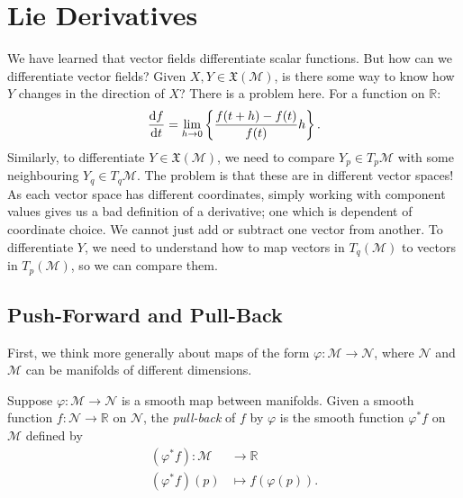 \section{Lie Derivatives}%
\label{sec:lie_derivatives}

We have learned that vector fields differentiate scalar functions. But how can we differentiate vector fields?
Given $X, Y \in \mathfrak{X}(\mathcal{M})$, is there some way to know how $Y$ changes in the direction of $X$?
There is a problem here. For a function on $\mathbb{R}$:
\begin{equation}
\dv{f}{t} = \lim_{h \to 0} \left\{ \frac{f(t + h) - f(t)}{f(t)}{h} \right\}.
\end{equation}
Similarly, to differentiate $Y \in \mathfrak{X}(\mathcal{M})$, we need to compare $Y_p \in T_p \mathcal{M}$ with some neighbouring $Y_q \in T_q \mathcal{M}$. The problem is that these are in different vector spaces! As each vector space has different coordinates, simply working with component values gives us a bad definition of a derivative; one which is dependent of coordinate choice. We cannot just add or subtract one vector from another.
To differentiate $Y$, we need to understand how to map vectors in $T_q (\mathcal{M})$ to vectors in $T_p(\mathcal{M})$, so we can compare them.

\subsection{Push-Forward and Pull-Back}%
\label{sub:push_forward_and_pull_back}

First, we think more generally about maps of the form $\varphi: \mathcal{M} \to \mathcal{N}$, where $\mathcal{N}$ and $\mathcal{M}$ can be manifolds of different dimensions.
\begin{definition}
  Suppose $\varphi: \mathcal{M} \to \mathcal{N}$ is a smooth map between manifolds.
  Given a smooth function $f : \mathcal{N} \to \mathbb{R}$ on $\mathcal{N}$, the \emph{pull-back} of $f$ by $\varphi$ is the smooth function $\varphi^* f$ on $\mathcal{M}$ defined by 
  \begin{equation}
    \begin{split}
      (\varphi^* f) \colon \mathcal{M} &\to \mathbb{R} \\
      (\varphi^* f)(p) &\mapsto f(\varphi(p)).
    \end{split}
  \end{equation}
\end{definition}

